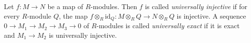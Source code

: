 \begin{definition}
\label{definition-universally-injective}
Let $f: M \to N$ be a map of $R$-modules.  Then $f$ is called
{\it universally injective} if for every $R$-module $Q$, the map $f
\otimes_R \text{id}_Q: M \otimes_R Q \to N \otimes_R Q$
is injective.  A sequence $0 \to M_1 \to M_2 \to M_3
\to 0$ of $R$-modules is called {\it universally exact} if it is exact
and $M_1 \to M_2$ is universally injective.
\end{definition}